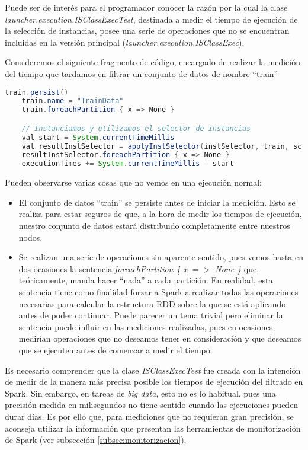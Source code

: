 Puede ser de interés para el programador conocer la razón por la cual la clase \textit{launcher.execution.ISClassExecTest}, destinada a medir el tiempo de ejecución de la selección de instancias, posee una serie de operaciones que no se encuentran incluidas en la versión principal (\textit{launcher.execution.ISClassExec}).

Consideremos el siguiente fragmento de código, encargado de realizar la medición del tiempo que tardamos en filtrar un conjunto de datos de nombre ``train''

\begin{lstlisting}[float,language=Java,tabsize=4,frame = single,caption=Código de medición de tiempo de filtrado ,captionpos=b,label=lst:codigoEclipse]
    train.persist()
    train.name = "TrainData"
    train.foreachPartition { x => None }

    // Instanciamos y utilizamos el selector de instancias
    val start = System.currentTimeMillis
    val resultInstSelector = applyInstSelector(instSelector, train, sc).persist
    resultInstSelector.foreachPartition { x => None }
    executionTimes += System.currentTimeMillis - start
\end{lstlisting}

Pueden observarse varias cosas que no vemos en una ejecución normal:
\begin{itemize}
	\item El conjunto de datos ``train'' se persiste antes de iniciar la medición. Esto se realiza para estar seguros de que, a la hora de medir los tiempos de ejecución, nuestro conjunto de datos estará distribuido completamente entre nuestros nodos.
	\item Se realizan una serie de operaciones sin aparente sentido, pues vemos hasta en dos ocasiones la sentencia \textit{foreachPartition \{ x $=>$ None \}} que, teóricamente, manda hacer ``nada'' a cada partición. En realidad, esta sentencia tiene como finalidad forzar a Spark a realizar todas las operaciones necesarias para calcular la estructura RDD sobre la que se está aplicando antes de poder continuar. Puede parecer un tema trivial pero eliminar la sentencia puede influir en las mediciones realizadas, pues en ocasiones medirían operaciones que no deseamos tener en consideración y que deseamos que se ejecuten antes de comenzar a medir el tiempo.
\end{itemize}


Es necesario comprender que la clase \textit{ISClassExecTest} fue creada con la intención de medir de la manera más precisa posible los tiempos de ejecución del filtrado en Spark. Sin embargo, en tareas de \textit{big data}, esto no es lo habitual, pues una precisión medida en milisegundos no tiene sentido cuando las ejecuciones pueden durar días. Es por ello que, para mediciones que no requieran gran precisión, se aconseja utilizar la información que presentan las herramientas de monitorización de Spark (ver subsección \ref{subsec:monitorizacion}).
